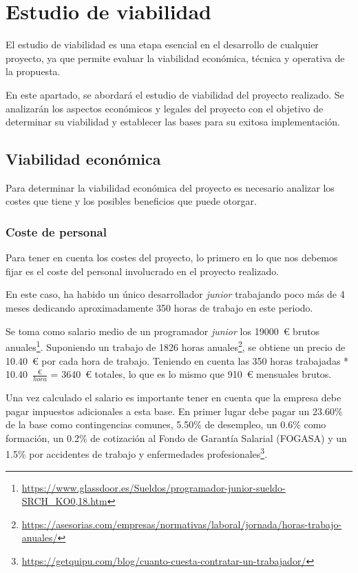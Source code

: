 \section{Estudio de viabilidad}
El estudio de viabilidad es una etapa esencial en el desarrollo de cualquier proyecto, ya que permite evaluar la viabilidad económica, técnica y operativa de la propuesta. 

En este apartado, se abordará el estudio de viabilidad del proyecto realizado.
Se analizarán los aspectos económicos y legales del proyecto con el objetivo de determinar su viabilidad y establecer las bases para su exitosa implementación.

\subsection{Viabilidad económica}
Para determinar la viabilidad económica del proyecto es necesario analizar los costes que tiene y los posibles beneficios que puede otorgar.

\subsubsection{Coste de personal}
Para tener en cuenta los costes del proyecto, lo primero en lo que nos debemos fijar es el coste del personal involucrado en el proyecto realizado.

En este caso, ha habido un único desarrollador \textit{junior} trabajando poco más de 4 meses dedicando aproximadamente 350 horas de trabajo en este periodo.

Se toma como salario medio de un programador \textit{junior} los 19000~€ brutos anuales\footnote{\url{https://www.glassdoor.es/Sueldos/programador-junior-sueldo-SRCH_KO0,18.htm}}.
Suponiendo un trabajo de 1826 horas anuales\footnote{\url{https://asesorias.com/empresas/normativas/laboral/jornada/horas-trabajo-anuales/}}, se obtiene un precio de 10.40~€ por cada hora de trabajo.
Teniendo en cuenta las 350 horas trabajadas * 10.40~$\frac{\text{€}}{hora}$ = 3640~€ totales, lo que es lo mismo que 910~€ mensuales brutos.

Una vez calculado el salario es importante tener en cuenta que la empresa debe pagar impuestos adicionales a esta base.
En primer lugar debe pagar un 23.60\% de la base como contingencias comunes, 5.50\% de desempleo, un 0.6\% como formación, un 0.2\% de cotización al Fondo de Garantía Salarial (FOGASA) y un 1.5\% por accidentes de trabajo y enfermedades profesionales\footnote{\url{https://getquipu.com/blog/cuanto-cuesta-contratar-un-trabajador/}}.

